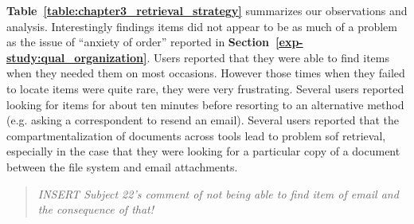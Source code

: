\noindent 
\textbf{Table~\ref{table:chapter3_retrieval_strategy}} summarizes our observations and analysis. Interestingly findings items did not appear to be as much of a problem as the issue of ``anxiety of order'' reported in \textbf{Section~\ref{exp-study:qual_organization}}.  Users reported that they were able to find items when they needed them on most occasions. However those times when they failed to locate items were quite rare, they were very frustrating. Several users reported looking for items for about ten minutes before resorting to an alternative method (e.g. asking a correspondent to resend an email). Several users reported that the compartmentalization of documents across tools lead to problem sof retrieval, especially in the case that they were looking for a particular copy of a document between the file system and email attachments.
\begin{quote}
	\textit{INSERT Subject 22's comment of not being able to find item of email and the consequence of that!}
\end{quote}

